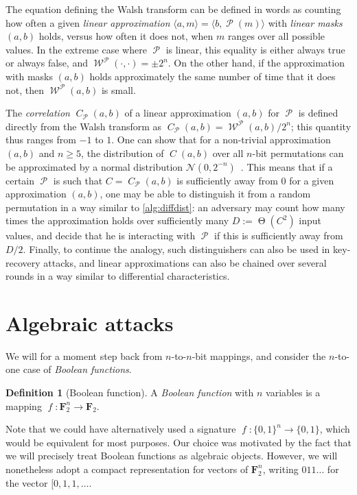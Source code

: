 \documentclass[11pt,a4paper]{article}
\theoremstyle{definition}
\newtheorem{defi}{Definition}
\theoremstyle{theorem}
\DeclareMathOperator\bF{\mathit{f}}
\DeclareMathOperator\Perm{\mathcal{P}}
\DeclareMathOperator\Walsh{\mathcal{W}}
\DeclareMathOperator\cor{\mathit{C}}
\DeclareMathOperator\tighto{\Theta}
\newcommand\msb{\{0,1\}^n}
\begin{document}
The equation defining the Walsh transform can be defined in words as counting how often a given \emph{linear approximation}
$\langle a, m \rangle = \langle b, \Perm(m) \rangle$ with \emph{linear masks} $(a,b)$ holds,
versus how often it does not, when $m$ ranges over all possible values. In the extreme
case where $\Perm$ is linear, this equality is either always true or always false, and $\Walsh^{\Perm}(\cdot,\cdot) = \pm 2^n$. On the other
hand, if the approximation with masks $(a,b)$ holds approximately the same number of time that it does not, then $\Walsh^{\Perm}(a,b)$ is
small.

The \emph{correlation} $\cor_{\Perm}(a,b)$ of a linear approximation $(a,b)$ for $\Perm$ is defined directly from the Walsh transform as
$\cor_{\Perm}(a,b) = \Walsh^{\Perm}(a,b)/2^n$; this quantity thus ranges from $-1$ to $1$.
One can show that for a non-trivial approximation $(a,b)$ and $n \geq 5$, the distribution
of $\cor(a,b)$ over all $n$-bit permutations can be approximated by a normal distribution
$\mathcal{N}(0,2^{-n})$~\cite{DBLP:journals/jmc/DaemenR07,DBLP:conf/fse/BogdanovT13}. This means
that if a certain $\Perm$ is such that $C = \cor_{\Perm}(a,b)$ is sufficiently away from $0$ for a given approximation $(a,b)$, one
may be able to distinguish it from a random permutation in a way similar to \autoref{alg:diffdist}: an adversary
may count how many times the
approximation holds over sufficiently many $D := \tighto(C^2)$ input values, and decide that he is interacting with $\Perm$ if this is sufficiently away
from $D/2$. Finally, to continue the analogy, such distinguishers can also be used in key-recovery attacks, and linear approximations can also be chained over several rounds
in a way similar to differential characteristics.


\section{Algebraic attacks}


We will for a moment step back from $n$-to-$n$-bit mappings, and consider the $n$-to-one case of \emph{Boolean functions}.
\begin{defi}[Boolean function]
A \emph{Boolean function} with $n$ variables is a mapping $\bF : \mathbf{F}_2^n \rightarrow \mathbf{F}_2$. 
\end{defi}
Note that we could have alternatively used a signature $\bF : \msb \rightarrow \{0,1\}$, which would be equivalent for most purposes.
Our choice was motivated by the fact that we will precisely treat Boolean functions as algebraic objects. However, we will
nonetheless adopt a compact representation for vectors of $\mathbf{F}_2^n$, writing $011\ldots$ for the vector $[0, 1, 1, \ldots$.
\end{document}
